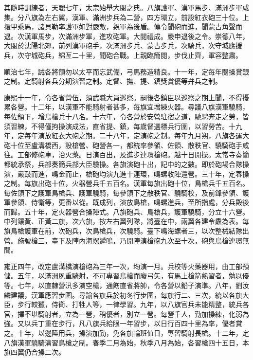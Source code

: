 \begin{pinyinscope}
其隨時訓練者，天聰七年，太宗始舉大閱之典。八旗護軍、漢軍馬步、滿洲步軍咸集。分八旗為左右翼，漢軍、滿洲步兵為二營，四方環立，前設紅衣砲三十位。上擐甲乘馬，諸貝勒率護軍如對嚴敵，親軍為後盾。傳令聞砲而進，聞蒙古角聲而退。次漢軍馬步，次滿洲步軍，進攻砲軍。大閱禮成。嚴申退後之令。崇德八年，大閱於沈陽北郊，前列漢軍砲手，次滿洲步兵、蒙古步兵，次騎兵，次守城應援兵，次守城砲兵，綿亙二十里，聞砲合戰。上親臨簡閱，步伐止齊，軍容整肅。

順治七年，誡各將領勿以太平而忘武備，弓馬務造精良。十一年，定每年閱操賞銀之制。定騎射各兵分期演習之制。定督、撫、提、鎮獎賞優等弁兵之制。

康熙十一年，令各省營伍，須武職大員巡察。嗣後各鎮臣以巡察之期上聞，不得擾累各營。十二年，以漢軍不能騎射者甚多，每旗宜增練火器。尋議八旗漢軍驍騎，每佐領下，增鳥槍兵十八名。十六年，令各營於安營駐宿之道，馳騁奔走之勞，皆須習練，不得僅拘操演成法，直省提、鎮，每歲督選標兵行圍，以習勞苦。十九年，定每年演放紅衣大砲之期。二十八年，定演砲之制。每年九月朔，八旗各運大砲十位至盧溝橋西，設槍營、砲營各一，都統率參領、佐領、散秩官、驍騎砲手咸往。工部修砲車，治火藥。日演百出，及進步連環槍砲。越十日開操。太常寺奏簡都統承祭，兵部奏簡兵部大臣驗操。各旗演砲十出，記中的之數。即於砲場合隊操演，嚴鼓而進，鳴金而止，槍砲均演九進十連環，鳴螺收陣還營。三十年，定春操之制。每旗出砲十位，火器營兵千五百名。漢軍每旗出砲十位，鳥槍兵千五百名。每佐領下之護軍鳥槍兵、護軍驍騎，每參領下之散秩官、驍騎校，及前鋒參領、護軍參領、侍衛等，更番以從。既成列，演放鳥槍，鳴螺進兵，至所指處，分兵殿後而歸。五十年，定火器營合操陣式。八旗砲兵、鳥槍兵，護軍驍騎，分立十六營。中列鑲黃、正黃二旗，次六旗，按左右翼列隊，將臺在中，兩翼各建令纛為表。每旗鳥槍護軍在前，次砲兵，次鳥槍兵，次驍騎。臺下鳴海螺者三，以次整械結隊出營。施號槍三，臺下及陣內海螺遞鳴，乃開陣演槍砲九次至十次，砲與鳥槍連環無間。

雍正四年，改定盧溝橋演槍砲為三年一次，均演一月。兵校等火藥器用，由工部預儲。五年，以滿洲夙重騎射，不可專習鳥槍而廢弓矢，有馬上槍箭熟習者，勉以優等。七年，以直隸營汛多演空槍，通飭直省將帥，令各營以鉛子演準。八年，劉汝麟建議，漢軍應習步圍。尋諭各旗兵於初冬行步圍，每旗行二、三次，統以各旗大臣，步行較獵，侍衛、打牲人等，一律學習。九年，以八旗官兵未能精整，統兵各官，擇不堪騎射者，立為一營，稍優者，別立一營。每營千人，勤加操練，化弱為強。又以兵丁重在步行，凡八旗兵給限一年習步，以日行百四十里為率，優者賞之。十年，以邊陲用兵，操演加勤，免各旗輪班值日，專習騎射長槍。十二年，定八旗漢軍驍騎演習鳥槍之制。春季二月為始，秋季八月為始，各習槍四十五日，本旗四翼仍合操二次。


\end{pinyinscope}
